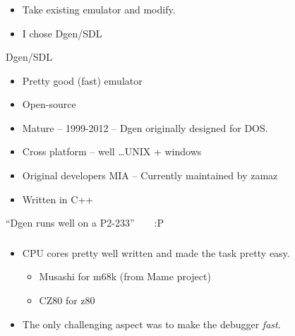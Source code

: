 \documentclass{beamer}
\begin{document}
\begin{frame}[fragile]
\frametitle{\insertsubsection}

\begin{itemize}
\item Take existing emulator and modify.
\item I chose Dgen/SDL
\end{itemize}

\vfill

\begin{block}{Dgen/SDL}
\begin{itemize}
\item Pretty good (fast) emulator
\item Open-source
\item Mature --  1999-2012 -- Dgen originally designed for DOS.
\item Cross platform -- well \ldots UNIX + windows
\item Original developers MIA -- Currently maintained by zamaz
\item Written in C++
\end{itemize}
\end{block}

\vfill

{\Large ``Dgen runs well on a P2-233''~~~~:P}

\end{frame}

\begin{frame}[fragile]
\frametitle{\insertsubsection}

\begin{itemize}
\item CPU cores pretty well written and made the task pretty easy.
\begin{itemize}
\item Musashi for m68k (from Mame project)
\item CZ80 for z80
\end{itemize}
\vfill
\item The only challenging aspect was to make the debugger \emph{fast}.
\end{itemize}

\vfill

\end{frame}

\end{document}
